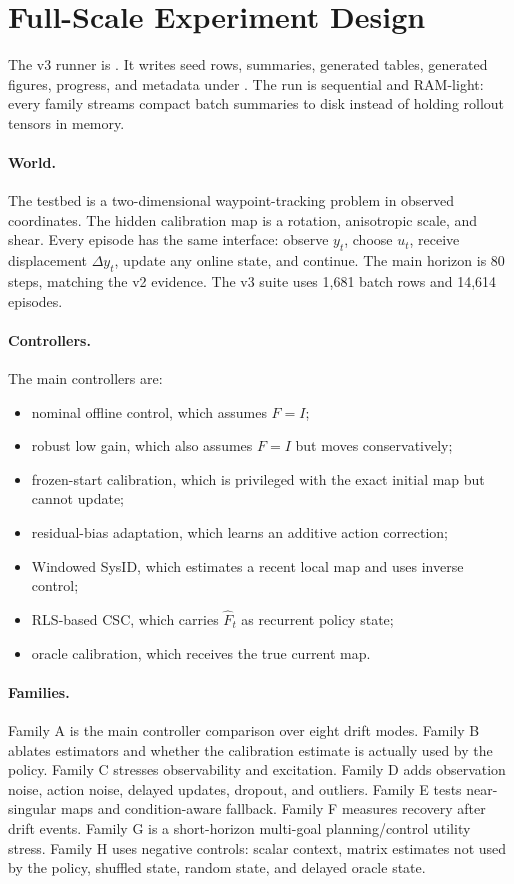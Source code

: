 \documentclass{article}
\newcommand{\obs}{y}
\newcommand{\act}{u}
\newcommand{\cmap}{F}
\newcommand{\cmaphat}{\hat F}
\begin{document}
\section{Full-Scale Experiment Design}

The v3 runner is . It writes
seed rows, summaries, generated tables, generated figures, progress, and
metadata under . The run is sequential and
RAM-light: every family streams compact batch summaries to disk instead of
holding rollout tensors in memory.



\paragraph{World.}
The testbed is a two-dimensional waypoint-tracking problem in observed
coordinates. The hidden calibration map is a rotation, anisotropic scale, and
shear. Every episode has the same interface: observe $\obs_t$, choose
$\act_t$, receive displacement $\Delta\obs_t$, update any online state, and
continue. The main horizon is 80 steps, matching the v2 evidence. The v3 suite
uses 1,681 batch rows and 14,614 episodes.

\paragraph{Controllers.}
The main controllers are:
\begin{itemize}[leftmargin=*]
\item nominal offline control, which assumes $\cmap=I$;
\item robust low gain, which also assumes $\cmap=I$ but moves conservatively;
\item frozen-start calibration, which is privileged with the exact initial map
but cannot update;
\item residual-bias adaptation, which learns an additive action correction;
\item Windowed SysID, which estimates a recent local map and uses inverse
control;
\item RLS-based CSC, which carries $\cmaphat_t$ as recurrent policy state;
\item oracle calibration, which receives the true current map.
\end{itemize}

\paragraph{Families.}
Family A is the main controller comparison over eight drift modes. Family B
ablates estimators and whether the calibration estimate is actually used by the
policy. Family C stresses observability and excitation. Family D adds
observation noise, action noise, delayed updates, dropout, and outliers. Family
E tests near-singular maps and condition-aware fallback. Family F measures
recovery after drift events. Family G is a short-horizon multi-goal
planning/control utility stress. Family H uses negative controls: scalar
context, matrix estimates not used by the policy, shuffled state, random state,
and delayed oracle state.
\end{document}
